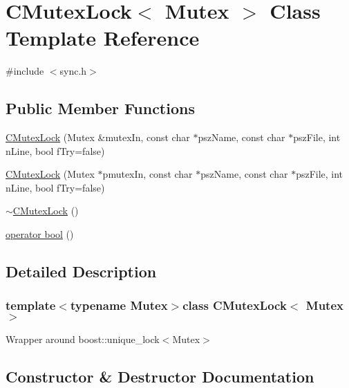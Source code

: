 \hypertarget{class_c_mutex_lock}{}\section{C\+Mutex\+Lock$<$ Mutex $>$ Class Template Reference}
\label{class_c_mutex_lock}


{\ttfamily \#include $<$sync.\+h$>$}

\subsection*{Public Member Functions}
\begin{DoxyCompactItemize}
\item 
\hyperlink{class_c_mutex_lock_ad08e2df1cad4c5732dafb1552abe6106}{C\+Mutex\+Lock} (Mutex \&mutex\+In, const char $\ast$psz\+Name, const char $\ast$psz\+File, int n\+Line, bool f\+Try=false)
\item 
\hyperlink{class_c_mutex_lock_add078de99511aea6719c4d161c753bb5}{C\+Mutex\+Lock} (Mutex $\ast$pmutex\+In, const char $\ast$psz\+Name, const char $\ast$psz\+File, int n\+Line, bool f\+Try=false)
\item 
\hyperlink{class_c_mutex_lock_af213c60c9abee229f5dc841670021c5a}{$\sim$\+C\+Mutex\+Lock} ()
\item 
\hyperlink{class_c_mutex_lock_a4358803c87a873252abebdd1b625d293}{operator bool} ()
\end{DoxyCompactItemize}


\subsection{Detailed Description}
\subsubsection*{template$<$typename Mutex$>$class C\+Mutex\+Lock$<$ Mutex $>$}

Wrapper around boost\+::unique\+\_\+lock$<$\+Mutex$>$ 

\subsection{Constructor \& Destructor Documentation}
\hypertarget{class_c_mutex_lock_ad08e2df1cad4c5732dafb1552abe6106}{}
